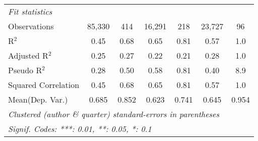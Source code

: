 \begin{tabular}{lcccccc}
   \midrule
   \emph{Fit statistics}\\
   Observations                                               & 85,330       & 414           & 16,291        & 218          & 23,727      & 96\\  
   R$^2$                                                      & 0.45         & 0.68          & 0.65          & 0.81         & 0.57        & 1.0\\  
   Adjusted R$^2$                                             & 0.25         & 0.27          & 0.22          & 0.21         & 0.28        & 1.0\\  
   Pseudo R$^2$                                               & 0.28         & 0.50          & 0.58          & 0.81         & 0.40        & 8.9\\  
   Squared Correlation                                        & 0.45         & 0.68          & 0.65          & 0.81         & 0.57        & 1.0\\  
Mean(Dep. Var.) & 0.685 & 0.852 & 0.623 & 0.741 & 0.645 & 0.954 \\
   \midrule \midrule
   \multicolumn{7}{l}{\emph{Clustered (author \& quarter) standard-errors in parentheses}}\\
   \multicolumn{7}{l}{\emph{Signif. Codes: ***: 0.01, **: 0.05, *: 0.1}}\\
\end{tabular}
\par\endgroup
